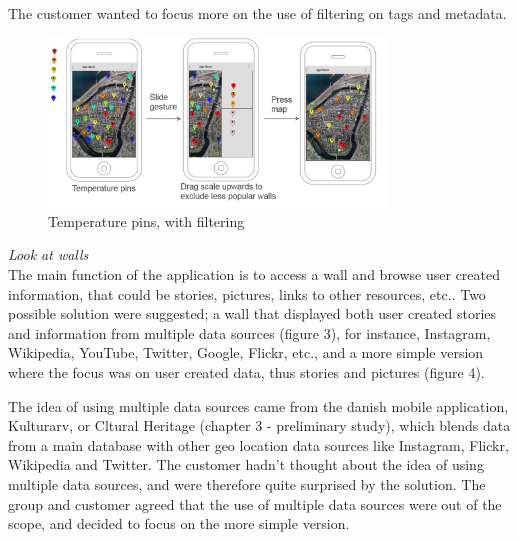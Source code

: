 \documentclass[11pt]{book}
\begin{document}
The customer wanted to focus more on the use of filtering on tags and metadata.

\begin{figure}[H]
      \centering
      \includegraphics[width=0.8\textwidth]{Figures/Phases/Sprint1/versiononeTempPings.png}
      \caption{Temperature pins, with filtering}
      \label{fig:phases_sprint1_uiVersionOneTempPings}
\end{figure}

\textit{Look at walls}\\
The main function of the application is to access a wall and browse user created information, that could be stories, pictures, links to other resources, etc.. Two possible solution were suggested; a wall that displayed both user created stories and information from multiple data sources (figure 3), for instance, Instagram, Wikipedia, YouTube, Twitter, Google, Flickr, etc., and a more simple version where the focus was on user created data, thus stories and pictures (figure 4). 

The idea of using multiple data sources came from the danish mobile application, Kulturarv, or Cltural Heritage (chapter 3 - preliminary study), which blends data from a main database with other geo location data sources like Instagram, Flickr, Wikipedia and Twitter. The customer hadn’t thought about the idea of using multiple data sources, and were therefore quite surprised by the solution. The group and customer agreed that the use of multiple data sources were out of the scope, and decided to focus on the more simple version.
\end{document}
